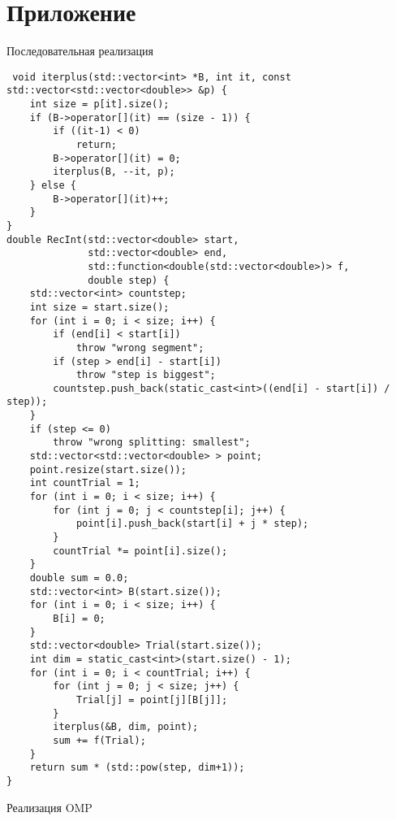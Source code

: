 \documentclass{report}
\begin{document}
 \section*{Приложение}
 \par Последовательная реализация
 \begin{lstlisting}
 void iterplus(std::vector<int> *B, int it, const std::vector<std::vector<double>> &p) {
    int size = p[it].size();
    if (B->operator[](it) == (size - 1)) {
        if ((it-1) < 0)
            return;
        B->operator[](it) = 0;
        iterplus(B, --it, p);
    } else {
        B->operator[](it)++;
    }
}
double RecInt(std::vector<double> start,
              std::vector<double> end,
              std::function<double(std::vector<double>)> f,
              double step) {
    std::vector<int> countstep;
    int size = start.size();
    for (int i = 0; i < size; i++) {
        if (end[i] < start[i])
            throw "wrong segment";
        if (step > end[i] - start[i])
            throw "step is biggest";
        countstep.push_back(static_cast<int>((end[i] - start[i]) / step));
    }
    if (step <= 0)
        throw "wrong splitting: smallest";
    std::vector<std::vector<double> > point;
    point.resize(start.size());
    int countTrial = 1;
    for (int i = 0; i < size; i++) {
        for (int j = 0; j < countstep[i]; j++) {
            point[i].push_back(start[i] + j * step);
        }
        countTrial *= point[i].size();
    }
    double sum = 0.0;
    std::vector<int> B(start.size());
    for (int i = 0; i < size; i++) {
        B[i] = 0;
    }
    std::vector<double> Trial(start.size());
    int dim = static_cast<int>(start.size() - 1);
    for (int i = 0; i < countTrial; i++) {
        for (int j = 0; j < size; j++) {
            Trial[j] = point[j][B[j]];
        }
        iterplus(&B, dim, point);
        sum += f(Trial);
    }
    return sum * (std::pow(step, dim+1));
}

 \end{lstlisting}
 \par Реализация OMP
\end{document}
